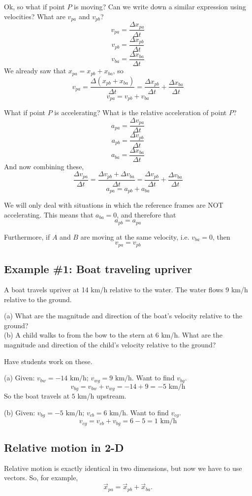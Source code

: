 Ok, so what if point $P$ is moving? Can we write down a similar expression using velocities? What are $v_{pa}$ and $v_{pb}$?
$$v_{pa}=\frac{\Delta{x_{pa}}}{\Delta{t}}$$
$$v_{pb}=\frac{\Delta{x_{pb}}}{\Delta{t}}$$
$$v_{ba}=\frac{\Delta{x_{ba}}}{\Delta{t}}$$
We already saw that $x_{pa}=x_{pb}+x_{ba}$, so
$$v_{pa}=\frac{\Delta(x_{pb}+x_{ba})}{\Delta{t}}=\frac{\Delta{x_{pb}}}{\Delta{t}}+\frac{\Delta{x_{ba}}}{\Delta{t}}$$
$$\boxed{v_{pa}=v_{pb}+v_{ba}}$$

What if point $P$ is accelerating? What is the relative acceleration of point $P$?
$$a_{pa}=\frac{\Delta{v_{pa}}}{\Delta{t}}$$
$$a_{pb}=\frac{\Delta{v_{pb}}}{\Delta{t}}$$
$$a_{ba}=\frac{\Delta{x_{ba}}}{\Delta{t}}$$
And now combining these,
$$\frac{\Delta{v_{pa}}}{\Delta{t}}=\frac{\Delta{v_{pb}}+\Delta{v_{ba}}}{\Delta{t}}=\frac{\Delta{v_{pb}}}{\Delta{t}}+\frac{\Delta{v_{ba}}}{\Delta{t}}$$
$$a_{pa}=a_{pb}+a_{ba}$$

We will only deal with situations in which the reference frames are NOT accelerating. This means that $a_{ba}=0$, and therefore that 
$$\boxed{a_{pb}=a_{pa}}$$

Furthermore, if $A$ and $B$ are moving at the same velocity, i.e. $v_{ba}=0$, then
$$\boxed{v_{pa}=v_{pb}}$$

\subsection{Example \#1: Boat traveling upriver}
A boat travels upriver at 14 km/h relative to the water. The water flows 9 km/h relative to the ground.

(a) What are the magnitude and direction of the boat's velocity relative to the ground?\\
(b) A child walks to from the bow to the stern at 6 km/h. What are the magnitude and direction of the child's velocity relative to the ground?

Have students work on these.

(a) Given: $v_{bw}=-14\mbox{ km/h}$; $v_{wg}=9\mbox{ km/h}$. Want to find $v_{bg}$.
$$v_{bg}=v_{bw}+v_{wg}=-14+9=-5\mbox{ km/h}$$
So the boat travels at $5$ km/h upstream.

(b) Given: $v_{bg}=-5\mbox{ km/h}$; $v_{cb}=6\mbox{ km/h}$. Want to find $v_{cg}$.
$$v_{cg}=v_{cb}+v_{bg}=6-5=1\mbox{ km/h}$$

\subsection{Relative motion in 2-D}
Relative motion is exactly identical in two dimensions, but now we have to use vectors. So, for example,
$$\vec{x}_{pa}=\vec{x}_{pb}+\vec{x}_{ba}.$$

